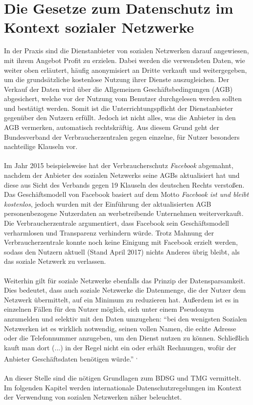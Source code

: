 \section{Die Gesetze zum Datenschutz im Kontext sozialer Netzwerke}
\label{KontextSozialeNetzwerke}
In der Praxis sind die Dienstanbieter von sozialen Netzwerken darauf angewiesen, mit ihrem Angebot Profit zu erzielen. Dabei werden die verwendeten Daten, wie weiter oben erläutert, häufig anonymisiert an Dritte verkauft und weitergegeben, um die grundsätzliche kostenlose Nutzung ihrer Dienste auszugleichen. Der Verkauf der Daten wird über die Allgemeinen Geschäftsbedingungen (\acs{AGB}) abgesichert, welche vor der Nutzung vom Benutzer durchgelesen werden sollten und bestätigt werden. Somit ist die Unterrichtungspflicht der Dienstanbieter gegenüber den Nutzern erfüllt. Jedoch ist nicht alles, was die Anbieter in den AGB vermerken, automatisch rechtskräftig. Aus diesem Grund geht der Bundesverband der Verbraucherzentralen gegen einzelne, für Nutzer besonders nachteilige Klauseln vor.\autocite[vgl.][]{klicksafe.de2}\\
\\Im Jahr 2015 beispielsweise hat der Verbraucherschutz \textit{Facebook} abgemahnt, nachdem der Anbieter des sozialen Netzwerks seine AGBs aktualisiert hat und diese aus Sicht des Verbands gegen 19 Klauseln des deutschen Rechts verstoßen. Das Geschäftsmodell von Facebook basiert auf dem Motto \textit{Facebook ist und bleibt kostenlos}, jedoch wurden mit der Einführung der aktualisierten AGB personenbezogene Nutzerdaten an werbetreibende Unternehmen weiterverkauft. Die Verbraucherzentrale argumentiert, dass Facebook sein Geschäftsmodell verharmlosen und Transparenz verhindern würde. Trotz Mahnung der Verbraucherzentrale konnte noch keine Einigung mit Facebook erzielt werden, sodass den Nutzern aktuell (Stand April 2017) nichts Anderes übrig bleibt, als das soziale Netzwerk zu verlassen.\autocite[vgl.][]{SpiegelOnline} \autocite[vgl.][]{Verbraucherzentrale}\\
\\Weiterhin gilt für soziale Netzwerke ebenfalls das Prinzip der Datensparsamkeit. Dies bedeutet, dass auch soziale Netzwerke die Datenmenge, die der Nutzer dem Netzwerk übermittelt, auf ein Minimum zu reduzieren hat. Außerdem ist es in einzelnen Fällen für den Nutzer möglich, sich unter einem Pseudonym anzumelden und selektiv mit den Daten umzugehen: "`bei den wenigsten Sozialen Netzwerken ist es wirklich notwendig, seinen vollen Namen, die echte Adresse oder die Telefonnummer anzugeben, um den Dienst nutzen zu können. Schließlich kauft man dort (...) in der Regel nicht ein oder erhält Rechnungen, wofür der Anbieter Geschäftsdaten benötigen würde."' \textsuperscript{ }\autocite[][]{klicksafe.de2}\textsuperscript{,} \autocite[vgl.][]{klicksafe.de2}\\
\\An dieser Stelle sind die nötigen Grundlagen zum BDSG und TMG vermittelt. Im folgenden Kapitel werden internationale Datenschutzregelungen im Kontext der Verwendung von sozialen Netzwerken näher beleuchtet.